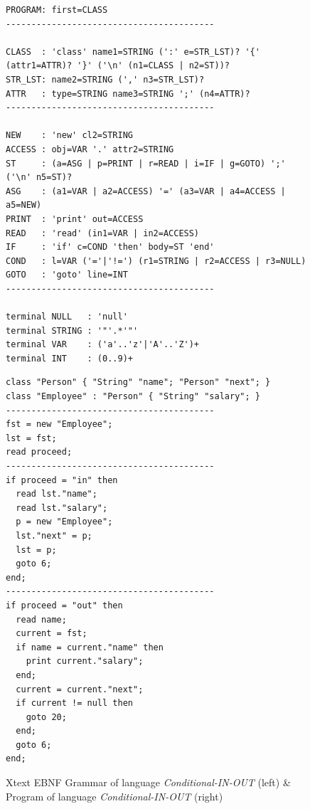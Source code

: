\begin{figure}[!tb]
\begin{minipage}[c]{.51\textwidth}
\begin{lstlisting}
PROGRAM: first=CLASS
-----------------------------------------

CLASS  : 'class' name1=STRING (':' e=STR_LST)? '{' (attr1=ATTR)? '}' ('\n' (n1=CLASS | n2=ST))?
STR_LST: name2=STRING (',' n3=STR_LST)?
ATTR   : type=STRING name3=STRING ';' (n4=ATTR)?
-----------------------------------------

NEW    : 'new' cl2=STRING
ACCESS : obj=VAR '.' attr2=STRING
ST     : (a=ASG | p=PRINT | r=READ | i=IF | g=GOTO) ';' ('\n' n5=ST)?
ASG    : (a1=VAR | a2=ACCESS) '=' (a3=VAR | a4=ACCESS | a5=NEW)
PRINT  : 'print' out=ACCESS
READ   : 'read' (in1=VAR | in2=ACCESS)
IF     : 'if' c=COND 'then' body=ST 'end'
COND   : l=VAR ('='|'!=') (r1=STRING | r2=ACCESS | r3=NULL)
GOTO   : 'goto' line=INT
-----------------------------------------

terminal NULL   : 'null'
terminal STRING	: '"'.*'"'
terminal VAR    : ('a'..'z'|'A'..'Z')+
terminal INT    : (0..9)+
\end{lstlisting}
\end{minipage}
\begin{minipage}[c]{.45\textwidth}
\begin{lstlisting}
class "Person" { "String" "name"; "Person" "next"; }
class "Employee" : "Person" { "String" "salary"; }
-----------------------------------------
fst = new "Employee";
lst = fst;
read proceed;
-----------------------------------------
if proceed = "in" then
  read lst."name";
  read lst."salary";
  p = new "Employee";
  lst."next" = p;
  lst = p;
  goto 6;
end;
-----------------------------------------
if proceed = "out" then
  read name;
  current = fst;
  if name = current."name" then
    print current."salary";
  end;
  current = current."next";
  if current != null then
    goto 20;
  end;
  goto 6;
end;
\end{lstlisting}
\end{minipage}
\caption{Xtext EBNF Grammar of language \textit{Conditional-IN-OUT} (left) \& Program of language \textit{Conditional-IN-OUT} (right)}
\label{fig:sec-compl-software-trans:ebnf_xtext}
\end{figure}

